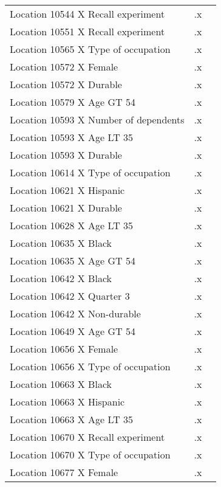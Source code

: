 \begin{tabular}{l*{2}{c}}
Location 10544 X Recall experiment&          .x&            \\
Location 10551 X Recall experiment&          .x&            \\
Location 10565 X Type of occupation&          .x&            \\
Location 10572 X Female&          .x&            \\
Location 10572 X Durable&          .x&            \\
Location 10579 X Age GT 54&          .x&            \\
Location 10593 X Number of dependents&          .x&            \\
Location 10593 X Age LT 35&          .x&            \\
Location 10593 X Durable&          .x&            \\
Location 10614 X Type of occupation&          .x&            \\
Location 10621 X Hispanic&          .x&            \\
Location 10621 X Durable&          .x&            \\
Location 10628 X Age LT 35&          .x&            \\
Location 10635 X Black&          .x&            \\
Location 10635 X Age GT 54&          .x&            \\
Location 10642 X Black&          .x&            \\
Location 10642 X Quarter 3&          .x&            \\
Location 10642 X Non-durable&          .x&            \\
Location 10649 X Age GT 54&          .x&            \\
Location 10656 X Female&          .x&            \\
Location 10656 X Type of occupation&          .x&            \\
Location 10663 X Black&          .x&            \\
Location 10663 X Hispanic&          .x&            \\
Location 10663 X Age LT 35&          .x&            \\
Location 10670 X Recall experiment&          .x&            \\
Location 10670 X Type of occupation&          .x&            \\
Location 10677 X Female&          .x&            \\

\end{tabular}
